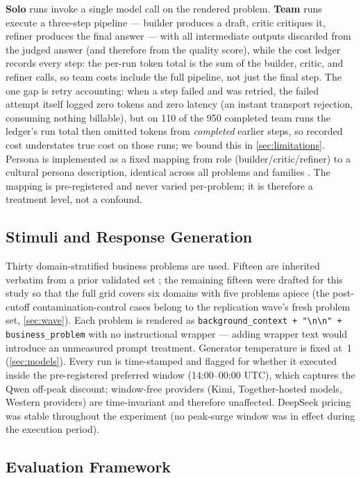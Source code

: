 \documentclass[12pt,a4paper]{article}
\begin{document}
\textbf{Solo} runs invoke a single model call on the rendered problem.
\textbf{Team} runs execute a three-step pipeline --- builder produces a draft,
critic critiques it, refiner produces the final answer --- with all intermediate
outputs discarded from the judged answer (and therefore from the quality score),
while the cost ledger records every step: the per-run token total is the sum of
the builder, critic, and refiner calls, so team costs include the full pipeline,
not just the final step. The one gap is retry accounting: when a step failed
and was retried, the failed attempt itself logged zero tokens and zero latency
(an instant transport rejection, consuming nothing billable), but on 110 of the
950 completed team runs the ledger's run total then omitted tokens from
\emph{completed} earlier steps, so recorded cost understates true cost on those
runs; we bound this in \cref{sec:limitations}. Persona is implemented as a fixed mapping from role
(builder/critic/refiner) to a cultural persona description, identical across all
problems and families \citep{Hariri2026b}. The mapping is pre-registered and
never varied per-problem; it is therefore a treatment level, not a confound.

\subsection{Stimuli and Response Generation}

Thirty domain-stratified business problems are used. Fifteen are inherited
verbatim from a prior validated set \citep{Hariri2025a}; the remaining fifteen
were drafted for this study so that the full grid covers six domains with five
problems apiece (the post-cutoff contamination-control cases belong to the
replication wave's fresh problem set, \cref{sec:wave}). Each problem is
rendered as \texttt{background\_context + "\textbackslash n\textbackslash n" +
business\_problem} with no instructional wrapper --- adding wrapper text would
introduce an unmeasured prompt treatment. Generator temperature is fixed at~1
(\cref{sec:models}). Every run is time-stamped and flagged for whether it
executed inside the pre-registered preferred window (14:00--00:00 UTC), which
captures the Qwen off-peak discount; window-free providers (Kimi, Together-hosted
models, Western providers) are time-invariant and therefore unaffected.
DeepSeek pricing was stable throughout the experiment (no peak-surge window was
in effect during the execution period).

\subsection{Evaluation Framework}\label{sec:eval}
\end{document}
